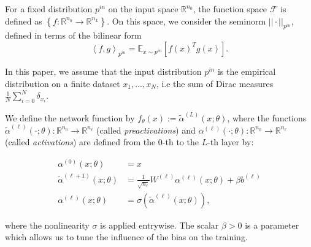 For a fixed distribution $p^{in}$ on the input space $\mathbb{R}^{n_0}$, the function space $\mathcal{F}$ is defined as $\left\{ f : \mathbb{R}^{n_0} \to \mathbb{R}^{n_L} \right\} $. On this space, we consider the seminorm $|| \cdot ||_{p^{in}} $, defined in terms of the bilinear form $$
\left<f, g\right>_{p^{in}} = \mathbb{E}_{x \sim p^{in}}\left[ f(x)^T g(x) \right].
$$

In this paper, we assume that the input distribution $p^{in}$ is the empirical distribution on a finite dataset $x_1, ..., x_N$, i.e the sum of Dirac measures $ \frac{1}{N} \sum_{i=0}^N \delta_{x_i}$. 

We define the network function by $f_\theta(x) := \tilde{\alpha}^{(L)}(x; \theta)$, where the functions $\tilde{\alpha}^{(\ell)}(\cdot; \theta) : \mathbb{R}^{n_0} \to\mathbb{R}^{n_\ell}$ (called \emph{preactivations}) and $\alpha^{(\ell)}(\cdot; \theta):\mathbb{R}^{n_0} \to\mathbb{R}^{n_\ell}$ (called \emph{activations}) are defined from the $0$-th to the $L$-th layer by:

\begin{align*}
    \alpha^{(0)}(x; \theta) &= x \\
    \tilde{\alpha}^{(\ell+1)}(x; \theta) &= \frac{1}{\sqrt{n_\ell}}W^{(\ell)} \alpha^{(\ell)}(x; \theta) + \beta b^{(\ell)} \\
    \alpha^{(\ell)}(x; \theta) &= \sigma(\tilde{\alpha}^{(\ell)}(x; \theta)),
\end{align*}

where the nonlinearity $\sigma$ is applied entrywise. The scalar $\beta > 0$ is a parameter which allows us to tune the influence of the bias on the training.

